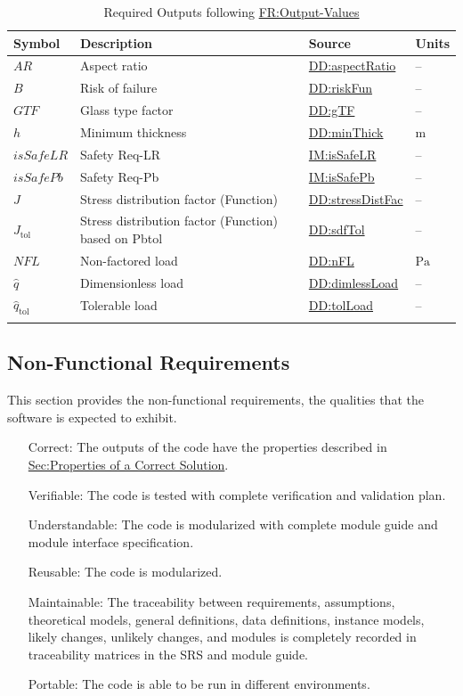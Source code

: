 \documentclass[12pt]{article}
\begin{document}
\begin{longtabu}{l X[l] l l}
\toprule
\textbf{Symbol} & \textbf{Description} & \textbf{Source} & \textbf{Units}
\\
\midrule
\endhead
$\mathit{AR}$ & Aspect ratio & \hyperref[DD:aspectRatio]{DD:aspectRatio} & --
\\
$B$ & Risk of failure & \hyperref[DD:riskFun]{DD:riskFun} & --
\\
$\mathit{GTF}$ & Glass type factor & \hyperref[DD:gTF]{DD:gTF} & --
\\
$h$ & Minimum thickness & \hyperref[DD:minThick]{DD:minThick} & ${\text{m}}$
\\
$\mathit{isSafeLR}$ & Safety Req-LR & \hyperref[IM:isSafeLR]{IM:isSafeLR} & --
\\
$\mathit{isSafePb}$ & Safety Req-Pb & \hyperref[IM:isSafePb]{IM:isSafePb} & --
\\
$J$ & Stress distribution factor (Function) & \hyperref[DD:stressDistFac]{DD:stressDistFac} & --
\\
${J_{\text{tol}}}$ & Stress distribution factor (Function) based on Pbtol & \hyperref[DD:sdfTol]{DD:sdfTol} & --
\\
$\mathit{NFL}$ & Non-factored load & \hyperref[DD:nFL]{DD:nFL} & ${\text{Pa}}$
\\
$\hat{q}$ & Dimensionless load & \hyperref[DD:dimlessLoad]{DD:dimlessLoad} & --
\\
${\hat{q}_{\text{tol}}}$ & Tolerable load & \hyperref[DD:tolLoad]{DD:tolLoad} & --
\\
\bottomrule
\caption{Required Outputs following \hyperref[outputValues]{FR:Output-Values}}
\label{Table:ReqOutputs}
\end{longtabu}
\subsection{Non-Functional Requirements}
\label{Sec:NFRs}
This section provides the non-functional requirements, the qualities that the software is expected to exhibit.

\begin{itemize}
\item[Correct:\phantomsection\label{correct}]{The outputs of the code have the properties described in \hyperref[Sec:CorSolProps]{Sec:Properties of a Correct Solution}.}
\item[Verifiable:\phantomsection\label{verifiable}]{The code is tested with complete verification and validation plan.}
\item[Understandable:\phantomsection\label{understandable}]{The code is modularized with complete module guide and module interface specification.}
\item[Reusable:\phantomsection\label{reusable}]{The code is modularized.}
\item[Maintainable:\phantomsection\label{maintainable}]{The traceability between requirements, assumptions, theoretical models, general definitions, data definitions, instance models, likely changes, unlikely changes, and modules is completely recorded in traceability matrices in the SRS and module guide.}
\item[Portable:\phantomsection\label{portable}]{The code is able to be run in different environments.}
\end{itemize}
\end{document}

